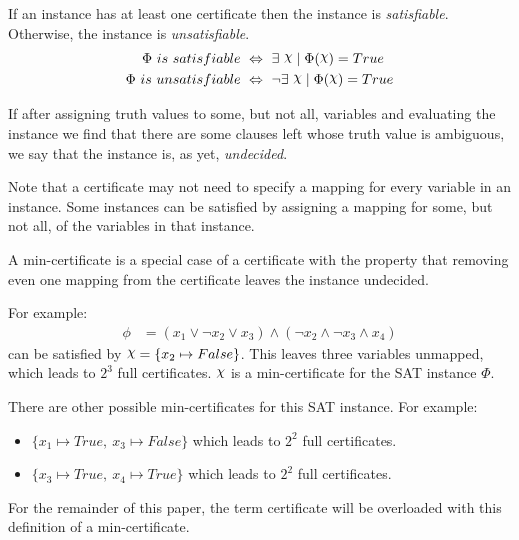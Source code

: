 \begin{definition}
\label{def:satisfiability}
    If an instance has at least one certificate then the instance is \textit{satisfiable}.
    Otherwise, the instance is \textit{unsatisfiable}.
    \begin{align*}
        \Phi~ is~ satisfiable~ & \Leftrightarrow~ \exists~ \rchi \mid \Phi(\rchi) = True \\
        \Phi~ is~ unsatisfiable~ & \Leftrightarrow~ \lnot \exists~ \rchi \mid \Phi(\rchi) = True
    \end{align*}

    If after assigning truth values to some, but not all, variables and evaluating the instance we find that there are some clauses left whose truth value is ambiguous, we say that the instance is, as yet, \textit{undecided}.
\end{definition}

Note that a certificate may not need to specify a mapping for every variable in an instance.
Some instances can be satisfied by assigning a mapping for some, but not all, of the variables in that instance.

\begin{definition}
\label{def:min-certificate}
    A min-certificate is a special case of a certificate with the property that removing even one mapping from the certificate leaves the instance undecided.
\end{definition}

For example:
\begin{align*}
    \phi & = (x_1 \lor \lnot x_2 \lor x_3) \land (\lnot x_2 \land \lnot x_3 \land x_4)
\end{align*}
can be satisfied by $ \rchi = \{ x_2 \mapsto False \} $.
This leaves three variables unmapped, which leads to $2^3$ full certificates.
$\rchi$ is a min-certificate for the SAT instance $\Phi$.

There are other possible min-certificates for this SAT instance.
For example:
\begin{itemize}
    \item $\{ x_1 \mapsto True,~ x_3 \mapsto False \}$ which leads to $2^2$ full certificates.
    \item $\{ x_3 \mapsto True,~ x_4 \mapsto True \}$ which leads to $2^2$ full certificates.
\end{itemize}

For the remainder of this paper, the term certificate will be overloaded with this definition of a min-certificate.

